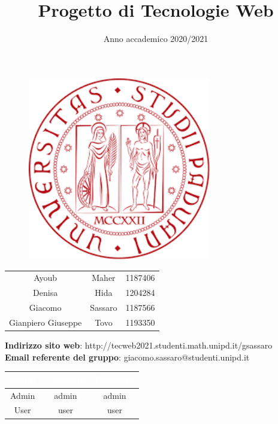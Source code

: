 \documentclass[12pt,a4paper]{article}
\title{Progetto di Tecnologie Web}
\author{}
\date{Anno accademico 2020/2021}
\begin{document}
\maketitle
\begin{figure}[H]
	\centering
	\includegraphics[width=8cm]{utility/logo.png}
\end{figure}
\begin{table}[H]
	\centering
	\renewcommand{\arraystretch}{2}
	\begin{longtable}{c c c}
		\rowcolor{green}\multicolumn{3}{c }{\textcolor{white}{\textbf{Componenti}}}\\
		\endhead
		 Ayoub & Maher & 1187406 \\
		 Denisa & Hida & 1204284 \\
		 Giacomo & Sassaro & 1187566 \\
		 Gianpiero Giuseppe & Tovo & 1193350 \\
	\end{longtable}
\end{table}

\begin{center}
	\textbf{Indirizzo sito web}: http://tecweb2021.studenti.math.unipd.it/gsassaro\\
	\textbf{Email referente del gruppo}: giacomo.sassaro@studenti.unipd.it
\end{center}

\begin{table}[H]
	\centering
	\renewcommand{\arraystretch}{2}
	\begin{longtable}{c | c c}
		\rowcolor{green}\textcolor{white}{\textbf{Utenti}} & \textcolor{white}{\textbf{Username}} & \textcolor{white}{\textbf{Password}}\\
		\endhead
		Admin & admin & admin\\
		User & user  & user \\
	\end{longtable}
\end{table}
\newpage
{}
\tableofcontents
\newpage

\newpage

\newpage

\newpage

\newpage

\newpage

\end{document}
